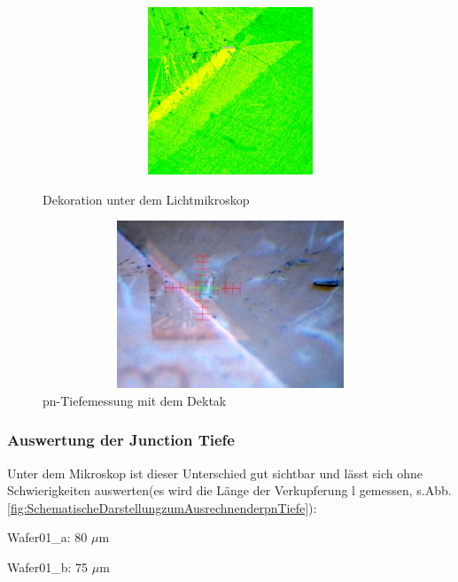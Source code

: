 \begin{figure}[H]
\centering
\begin{minipage}[hbt]{6cm}
    \centering
    \includegraphics[width=1\textwidth, height=5cm]{bilder/DekorationunterdemLichtmikroskop.png}
  \caption{Dekoration unter dem Lichtmikroskop}
  \label{fig:DekorationunterdemLichtmikroskop}
\end{minipage}
\hfill
\begin{minipage}[hbt]{7cm}
    \centering
    \includegraphics[width=1\textwidth,height=5cm]{bilder/pn-TiefemessungmitdemDektak.png}
  \caption{pn-Tiefemessung mit dem Dektak}
  \label{fig:pn-TiefemessungmitdemDektak}
\end{minipage}

\end{figure}

\subsubsection[Auswertung der Junction Tiefe ]{Auswertung der Junction Tiefe}

Unter dem Mikroskop ist dieser Unterschied gut sichtbar und lässt sich ohne Schwierigkeiten auswerten(es wird die Länge der Verkupferung l gemessen, s.Abb. \ref{fig:SchematischeDarstellungzumAusrechnenderpnTiefe}):

\vspace{3mm}
\begin{center}
Wafer01\_a: 80 $\mu$m

Wafer01\_b: 75 $\mu$m
\end{center}

